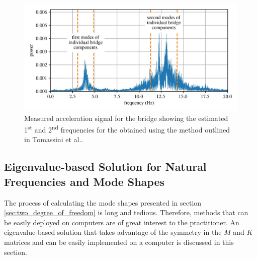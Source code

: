 \documentclass[12pt,letter]{article}
\begin{document}
\begin{vibration_case_study}
	\begin{figure}[H]
		\centering
		\includegraphics[width=\linewidth]{../figures/case_study_closely_coupled_bridge_frequencies_2}
		\caption{Measured acceleration signal for the bridge showing the estimated 1\textsuperscript{st} and 2\textsuperscript{nd} frequencies for the obtained using the method outlined in Tomassini et al.\protect\footnotemark[1].}
		\label{fig:case_study_closely_coupled_bridge_frequencies_2}
	\end{figure}
	
	\end{vibration_case_study}


	
	\subsection{Eigenvalue-based Solution for Natural Frequencies and Mode Shapes}
	
	The process of calculating the mode shapes presented in section \ref{sec:two_degree_of_freedom} is long and tedious. Therefore, methods that can be easily deployed on computers are of great interest to the practitioner. An eigenvalue-based solution that takes advantage of the symmetry in the $M$ and $K$ matrices and can be easily implemented on a computer is discussed in this section. 
	
\end{document}
